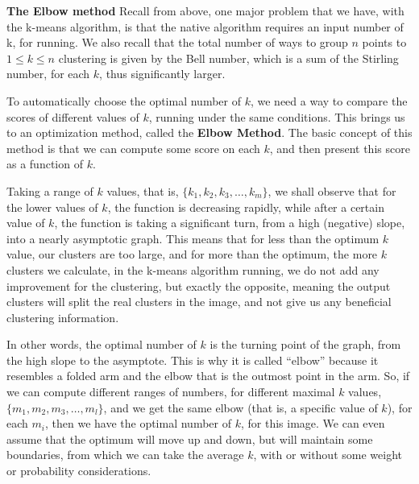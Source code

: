 \documentclass[12pt]{article}
\begin{document}
\textbf{The Elbow method} \newline
Recall from above, one major problem that we have, with the k-means algorithm, is that the native algorithm requires an input number of k, for running. We also recall that the total number of ways to group \( n \) points to \( 1 \leq k \leq n \) clustering is given by the Bell number, which is a sum of the Stirling number, for each \( k \), thus significantly larger. \newline

To automatically choose the optimal number of \( k \), we need a way to compare the scores of different values of \( k \), running under the same conditions. This brings us to an optimization method, called the \textbf{Elbow Method}. The basic concept of this method is that we can compute some score on each \( k \), and then present this score as a function of \( k \). \newline

Taking a range of \( k \) values, that is, \( \{k_1,k_2,k_3,…,k_m \} \), we shall observe that for the lower values of \( k \), the function is decreasing rapidly, while after a certain value of \( k \), the function is taking a significant turn, from a high (negative) slope, into a nearly asymptotic graph. 
This means that for less than the optimum \( k \) value, our clusters are too large, and for more than the optimum, the more \( k \) clusters we calculate, in the k-means algorithm running, we do not add any improvement for the clustering, but exactly the opposite, meaning the output clusters will split the real clusters in the image, and not give us any beneficial clustering information. \newline

In other words, the optimal number of \( k \) is the turning point of the graph, from the high slope to the asymptote. This is why it is called “elbow” because it resembles a folded arm and the elbow that is the outmost point in the arm. So, if we can compute different ranges of numbers, for different maximal \( k \) values, \( \{m_1,m_2,m_3,…,m_l \} \), and we get the same elbow (that is, a specific value of \( k \)), for each \( m_i \), then we have the optimal number of \( k \), for this image. We can even assume that the optimum will move up and down, but will maintain some boundaries, from which we can take the average \( k \), with or without some weight or probability considerations. \newline
\end{document}
